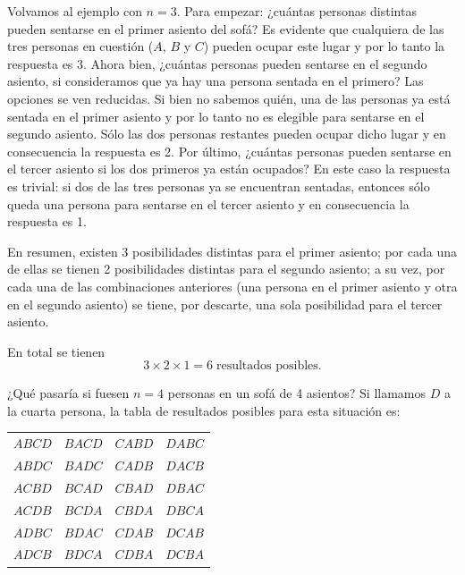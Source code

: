\documentclass[
  letterpaper,
  DIV=11,
  numbers=noendperiod]{scrreprt}
\begin{document}
Volvamos al ejemplo con \(n=3\). Para empezar: ¿cuántas personas
distintas pueden sentarse en el primer asiento del sofá? Es evidente que
cualquiera de las tres personas en cuestión (\(A\), \(B\) y \(C\))
pueden ocupar este lugar y por lo tanto la respuesta es 3. Ahora bien,
¿cuántas personas pueden sentarse en el segundo asiento, si consideramos
que ya hay una persona sentada en el primero? Las opciones se ven
reducidas. Si bien no sabemos quién, una de las personas ya está sentada
en el primer asiento y por lo tanto no es elegible para sentarse en el
segundo asiento. Sólo las dos personas restantes pueden ocupar dicho
lugar y en consecuencia la respuesta es 2. Por último, ¿cuántas personas
pueden sentarse en el tercer asiento si los dos primeros ya están
ocupados? En este caso la respuesta es trivial: si dos de las tres
personas ya se encuentran sentadas, entonces sólo queda una persona para
sentarse en el tercer asiento y en consecuencia la respuesta es 1.

En resumen, existen 3 posibilidades distintas para el primer asiento;
por cada una de ellas se tienen 2 posibilidades distintas para el
segundo asiento; a su vez, por cada una de las combinaciones anteriores
(una persona en el primer asiento y otra en el segundo asiento) se
tiene, por descarte, una sola posibilidad para el tercer asiento.

En total se tienen
\[3 \times 2 \times 1 = 6 \;\text{resultados posibles.}\]

¿Qué pasaría si fuesen \(n=4\) personas en un sofá de 4 asientos? Si
llamamos \(D\) a la cuarta persona, la tabla de resultados posibles para
esta situación es:

\begin{flexcenter}

\begin{half}

\begin{longtable}[]{@{}llll@{}}
\toprule\noalign{}
\endhead
\bottomrule\noalign{}
\endlastfoot
\(ABCD\) & \(BACD\) & \(CABD\) & \(DABC\) \\
\(ABDC\) & \(BADC\) & \(CADB\) & \(DACB\) \\
\(ACBD\) & \(BCAD\) & \(CBAD\) & \(DBAC\) \\
\(ACDB\) & \(BCDA\) & \(CBDA\) & \(DBCA\) \\
\(ADBC\) & \(BDAC\) & \(CDAB\) & \(DCAB\) \\
\(ADCB\) & \(BDCA\) & \(CDBA\) & \(DCBA\) \\
\end{longtable}

\end{half}

\end{flexcenter}
\end{document}
